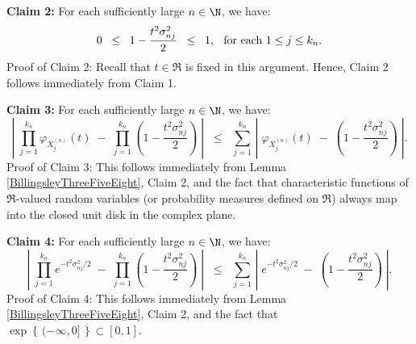 \vskip 0.5cm
\noindent
\textbf{Claim 2:}
For each sufficiently large $n \in \N$, we have:
\begin{equation*}
0 \;\;\leq\;\; 1 - \dfrac{t^{2}\sigma^{2}_{nj}}{2} \;\; \leq \;\; 1,
\;\;\,
\textnormal{for each $1 \leq j \leq k_{n}$}.
\end{equation*}
{\small Proof of Claim 2: Recall that $t \in \Re$ is fixed in this argument. Hence, Claim 2 follows immediately from Claim 1.
}

\vskip 0.5cm
\noindent
\textbf{Claim 3:}
For each sufficiently large $n \in \N$, we have:
\begin{equation*}
\left\vert\;
\prod_{j=1}^{k_{n}}\varphi_{X^{(n)}_{j}}(t) \; - \; \prod_{j=1}^{k_{n}}\left(1 - \dfrac{t^{2}\sigma^{2}_{nj}}{2}\right)
\;\right\vert
\;\;\leq\;\;
\sum_{j=1}^{k_{n}}\,
\left\vert\;\varphi_{X^{(n)}_{j}}(t) \; - \; \left(1 - \dfrac{t^{2}\sigma^{2}_{nj}}{2}\right)\;\right\vert.
\end{equation*}
{\small Proof of Claim 3:
This follows immediately from Lemma \ref{BillingsleyThreeFiveEight}, Claim 2, and the
fact that characteristic functions of $\Re$-valued random variables (or probability measures defined on $\Re$)
always map into the closed unit disk in the complex plane.
}

\vskip 0.5cm
\noindent
\textbf{Claim 4:}
For each sufficiently large $n \in \N$, we have:
\begin{equation*}
\left\vert\;
\prod_{j=1}^{k_{n}} e^{-t^{2}\sigma^{2}_{nj}/2} \; - \; \prod_{j=1}^{k_{n}}\left(1 - \dfrac{t^{2}\sigma^{2}_{nj}}{2}\right)
\;\right\vert
\;\;\leq\;\;
\sum_{j=1}^{k_{n}}\,
\left\vert\; e^{-t^{2}\sigma^{2}_{nj}/2} \; - \; \left(1 - \dfrac{t^{2}\sigma^{2}_{nj}}{2}\right)\;\right\vert.
\end{equation*}
{\small Proof of Claim 4:
This follows immediately from Lemma \ref{BillingsleyThreeFiveEight}, Claim 2, and the
fact that $\exp\!\left\{\,(-\infty,0]\,\right\} \subset [0,1]$.
}

